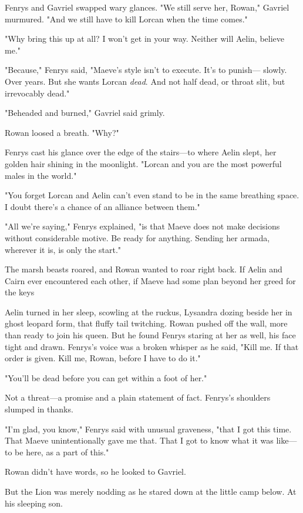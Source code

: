 Fenrys and Gavriel swapped wary glances.
"We still serve her, Rowan," Gavriel murmured.
"And we still have to kill Lorcan when the time comes."

"Why bring this up at all?
I won't get in your way.
Neither will Aelin, believe me."

"Because," Fenrys said, "Maeve's style isn't to execute.
It's to punish--- slowly.
Over years.
But she wants Lorcan \emph{dead}.
And not half dead, or throat slit, but irrevocably dead."

"Beheaded and burned," Gavriel said grimly.

Rowan loosed a breath.
"Why?"

Fenrys cast his glance over the edge of the stairs---to where Aelin slept, her golden hair shining in the moonlight.
"Lorcan and you are the most powerful males in the world."

"You forget Lorcan and Aelin can't even stand to be in the same breathing space.
I doubt there's a chance of an alliance between them."

"All we're saying," Fenrys explained, "is that Maeve does not make decisions without considerable motive.
Be ready for anything.
Sending her armada, wherever it is, is only the start."

The marsh beasts roared, and Rowan wanted to roar right back.
If Aelin and Cairn ever encountered each other, if Maeve had some plan beyond her greed for the keys 

Aelin turned in her sleep, scowling at the ruckus, Lysandra dozing beside her in ghost leopard form, that fluffy tail twitching.
Rowan pushed off the wall, more than ready to join his queen.
But he found Fenrys staring at her as well, his face tight and drawn.
Fenrys's voice was a broken whisper as he said, "Kill me.
If that order is given.
Kill me, Rowan, before I have to do it."

"You'll be dead before you can get within a foot of her."

Not a threat---a promise and a plain statement of fact.
Fenrys's shoulders slumped in thanks.

"I'm glad, you know," Fenrys said with unusual graveness, "that I got this time.
That Maeve unintentionally gave me that.
That I got to know what it was like---to be here, as a part of this."

Rowan didn't have words, so he looked to Gavriel.

But the Lion was merely nodding as he stared down at the little camp below.
At his sleeping son.

